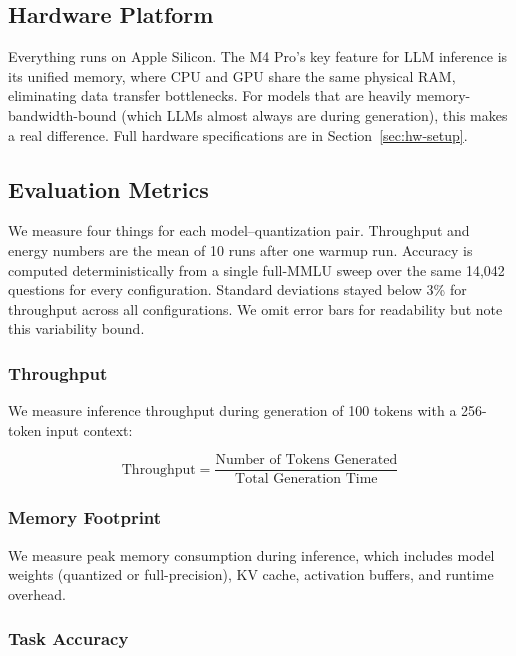 \documentclass[journal]{IEEEtran}
\begin{document}
\subsection{Hardware Platform}

Everything runs on Apple Silicon. The M4 Pro's key feature for LLM inference is its unified memory, where CPU and GPU share the same physical RAM, eliminating data transfer bottlenecks. For models that are heavily memory-bandwidth-bound (which LLMs almost always are during generation), this makes a real difference. Full hardware specifications are in Section~\ref{sec:hw-setup}.

\subsection{Evaluation Metrics}

We measure four things for each model--quantization pair. Throughput and energy numbers are the mean of 10 runs after one warmup run. Accuracy is computed deterministically from a single full-MMLU sweep over the same 14,042 questions for every configuration. Standard deviations stayed below 3\% for throughput across all configurations. We omit error bars for readability but note this variability bound.

\subsubsection{Throughput}

We measure inference throughput during generation of 100 tokens with a 256-token input context:

\begin{equation}
\text{Throughput} = \frac{\text{Number of Tokens Generated}}{\text{Total Generation Time}}
\end{equation}

\subsubsection{Memory Footprint}

We measure peak memory consumption during inference, which includes model weights (quantized or full-precision), KV cache, activation buffers, and runtime overhead.

\subsubsection{Task Accuracy}
\end{document}
